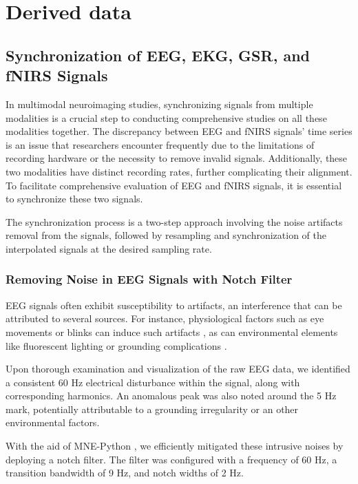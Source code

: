 \section{Derived data}

\subsection{Synchronization of EEG, EKG, GSR, and fNIRS Signals}

In multimodal neuroimaging studies, synchronizing signals from multiple modalities is a crucial step to conducting comprehensive studies on all these modalities together. The discrepancy between EEG and fNIRS signals' time series is an issue that researchers encounter frequently due to the limitations of recording hardware or the necessity to remove invalid signals. Additionally, these two modalities have distinct recording rates, further complicating their alignment. To facilitate comprehensive evaluation of EEG and fNIRS signals, it is essential to synchronize these two signals.

The synchronization process is a two-step approach involving the noise artifacts removal from the signals, followed by resampling and synchronization of the interpolated signals at the desired sampling rate.

\subsubsection{Removing Noise in EEG Signals with Notch Filter}

EEG signals often exhibit susceptibility to artifacts, an interference that can be attributed to several sources. For instance, physiological factors such as eye movements or blinks can induce such artifacts \cite{10.3389/fnhum.2012.00278}, as can environmental elements like fluorescent lighting or grounding complications \cite{Kaya21}.

Upon thorough examination and visualization of the raw EEG data, we identified a consistent 60 Hz electrical disturbance within the signal, along with corresponding harmonics. An anomalous peak was also noted around the 5 Hz mark, potentially attributable to a grounding irregularity or an other environmental factors.

With the aid of MNE-Python \cite{GramfortEtAl2013a}, we efficiently mitigated these intrusive noises by deploying a notch filter. The filter was configured with a frequency of 60 Hz, a transition bandwidth of 9 Hz, and notch widths of 2 Hz.

